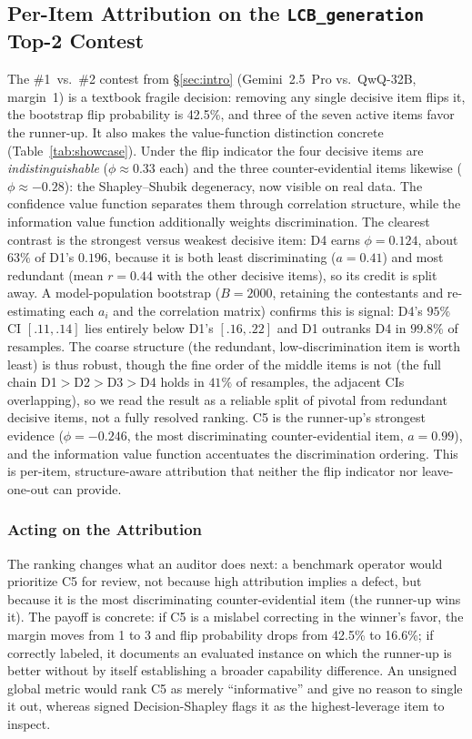 \documentclass[conference]{IEEEtran}
\begin{document}
\subsection{Per-Item Attribution on the \texttt{LCB\_generation} Top-2 Contest}
\label{sec:showcase}

The \#1~vs.~\#2 contest from \S\ref{sec:intro} (Gemini~2.5~Pro vs.\ QwQ-32B, margin~1) is a textbook fragile decision: removing any single decisive item flips it, the bootstrap flip probability is 42.5\%, and three of the seven active items favor the runner-up.
It also makes the value-function distinction concrete (Table~\ref{tab:showcase}).
Under the flip indicator the four decisive items are \emph{indistinguishable} ($\phi\approx0.33$ each) and the three counter-evidential items likewise ($\phi\approx-0.28$): the Shapley--Shubik degeneracy, now visible on real data.
The confidence value function separates them through correlation structure, while the information value function additionally weights discrimination.
The clearest contrast is the strongest versus weakest decisive item: D4 earns $\phi=0.124$, about $63\%$ of D1's $0.196$, because it is both least discriminating ($a=0.41$) and most redundant (mean $r=0.44$ with the other decisive items), so its credit is split away.
A model-population bootstrap ($B=2000$, retaining the contestants and re-estimating each $a_i$ and the correlation matrix) confirms this is signal: D4's $95\%$ CI $[.11,.14]$ lies entirely below D1's $[.16,.22]$ and D1 outranks D4 in $99.8\%$ of resamples.
The coarse structure (the redundant, low-discrimination item is worth least) is thus robust, though the fine order of the middle items is not (the full chain D1$>$D2$>$D3$>$D4 holds in $41\%$ of resamples, the adjacent CIs overlapping), so we read the result as a reliable split of pivotal from redundant decisive items, not a fully resolved ranking.
C5 is the runner-up's strongest evidence ($\phi=-0.246$, the most discriminating counter-evidential item, $a=0.99$), and the information value function accentuates the discrimination ordering.
This is per-item, structure-aware attribution that neither the flip indicator nor leave-one-out can provide.

\subsubsection{Acting on the Attribution}
The ranking changes what an auditor does next: a benchmark operator would prioritize C5 for review, not because high attribution implies a defect, but because it is the most discriminating counter-evidential item (the runner-up wins it).
The payoff is concrete: if C5 is a mislabel correcting in the winner's favor, the margin moves from 1 to 3 and flip probability drops from 42.5\% to 16.6\%; if correctly labeled, it documents an evaluated instance on which the runner-up is better without by itself establishing a broader capability difference.
An unsigned global metric would rank C5 as merely ``informative'' and give no reason to single it out, whereas signed Decision-Shapley flags it as the highest-leverage item to inspect.
\end{document}
